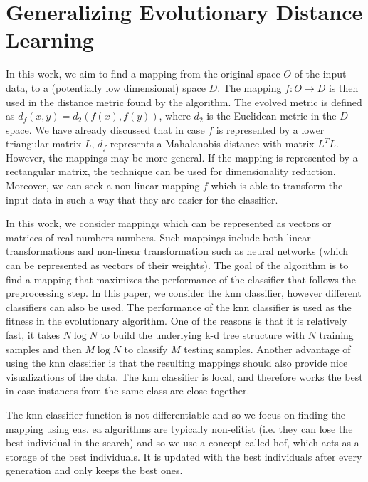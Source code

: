 \documentclass[12pt,a4paper]{report}
\begin{document}



\chapter{Generalizing Evolutionary Distance Learning} \label{chap:our-method}

In this work, we aim to find a mapping from the original space $O$ of the input data, to a (potentially low dimensional) space $D$. The mapping $f: O \to D$ is then used in the distance metric found by the algorithm. The evolved metric is defined as $d_f(x, y) = d_2(f(x), f(y))$, where $d_2$ is the Euclidean metric in the $D$ space. We have already discussed that in case $f$ is represented by a lower triangular matrix $L$, $d_f$ represents a Mahalanobis distance with matrix $L^TL$. However, the mappings may be more general. If the mapping is represented by a rectangular matrix, the technique can be used for dimensionality reduction. Moreover, we can seek a non-linear mapping $f$ which is able to transform the input data in such a way that they are easier for the classifier.

In this work, we consider mappings which can be represented as vectors or matrices of real numbers numbers. Such mappings include both linear transformations and non-linear transformation such as neural networks (which can be represented as vectors of their weights). The goal of the algorithm is to find a mapping that maximizes the performance of the classifier that follows the preprocessing step. In this paper, we consider the \ac{knn} classifier, however different classifiers can also be used. The performance of the \ac{knn} classifier is used as the fitness in the evolutionary algorithm. One of the reasons is that it is relatively fast, it takes $N\log{N}$ to build the underlying k-d tree structure with $N$ training samples and then $M \log{N}$ to classify $M$ testing samples. Another advantage of using the \ac{knn} classifier is that the resulting mappings should also provide nice visualizations of the data. The \ac{knn} classifier is local, and therefore works the best in case instances from the same class are close together.

The \ac{knn} classifier function is not differentiable and so we focus on finding the mapping using \aclp{ea}. \Ac{ea} algorithms are typically non-elitist (i.e. they can lose the best individual in the search) and so we use a concept called \acf{hof}, which acts as a storage of the best individuals. It is updated with the best individuals after every generation and only keeps the best ones.
\end{document}
